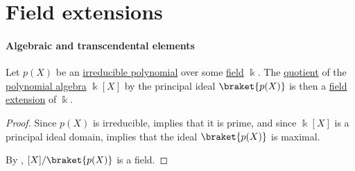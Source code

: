 \section{Field extensions}\label{sec:field_extensions}

\paragraph{Algebraic and transcendental elements}

\begin{lemma}\label{thm:quotient_by_irreducible_polynomial}
  Let \( p(X) \) be an \hyperref[def:domain_divisibility/irreducible]{irreducible polynomial} over some \hyperref[def:field]{field} \( \Bbbk \). The \hyperref[def:algebra_over_ring/quotient]{quotient} of the \hyperref[def:polynomial_algebra]{polynomial algebra} \( \Bbbk[X] \) by the principal ideal \( \braket{ p(X) } \) is then a \hyperref[def:field/submodel]{field extension} of \( \Bbbk \).
\end{lemma}
\begin{proof}
  Since \( p(X) \) is irreducible,  implies that it is prime, and since \( \Bbbk[X] \) is a principal ideal domain,  implies that the ideal \( \braket{ p(X) } \) is maximal.

  By , \( \Bbbk[X] / \braket{ p(X) } \) is a field.
\end{proof}

